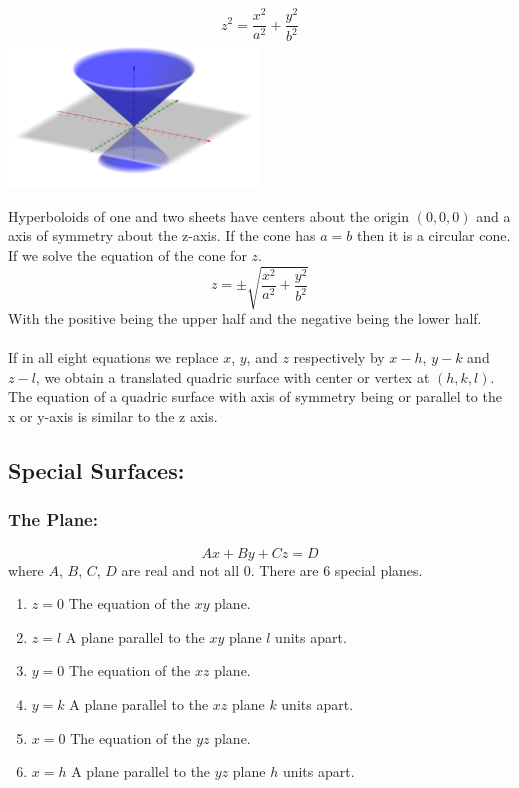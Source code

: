 \documentclass[14pt]{article}
\begin{document}
    \begin{multicols}{2}
        \begin{equation}z^2=\frac{x^2}{a^2}+\frac{y^2}{b^2}\end{equation}
        \includegraphics[width=0.5\textwidth]{Cone.png}
    \end{multicols}
    Hyperboloids of one and two sheets have centers about the origin $(0,0,0)$ and a axis of symmetry about the z-axis. If the cone has $a=b$ then it is a circular cone. If we solve the equation of the cone for $z$.
    $$z=\pm\sqrt{\frac{x^2}{a^2}+\frac{y^2}{b^2}}$$
    With the positive being the upper half and the negative being the lower half.\\\\
    If in all eight equations we replace $x$, $y$, and $z$ respectively by $x-h$, $y-k$ and $z-l$, we obtain a translated quadric surface with center or vertex at $(h,k,l)$. The equation of a quadric surface with axis of symmetry being or parallel to the x or y-axis is similar to the z axis.
    \subsection{Special Surfaces:}
    \subsubsection{The Plane:}
    $$Ax+By+Cz=D$$
    where $A$, $B$, $C$, $D$ are real and not all 0. There are 6 special planes.
    \begin{enumerate}
        \item $z=0$ The equation of the $xy$ plane.
        \item $z=l$ A plane parallel to the $xy$ plane $l$ units apart.
        \item $y=0$ The equation of the $xz$ plane.
        \item $y=k$ A plane parallel to the $xz$ plane $k$ units apart.
        \item $x=0$ The equation of the $yz$ plane.
        \item $x=h$ A plane parallel to the $yz$ plane $h$ units apart.
    \end{enumerate}
\end{document}

